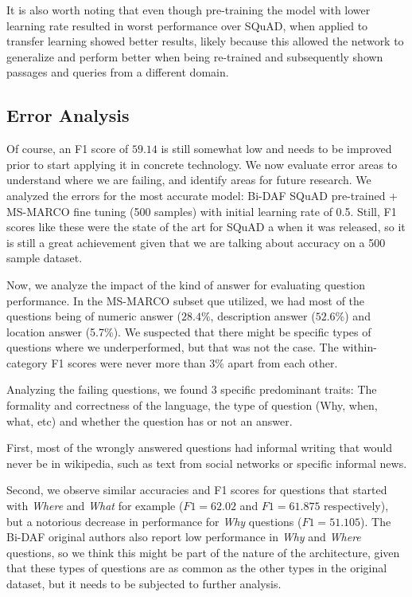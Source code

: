 \documentclass[11pt,a4paper]{article}
\begin{document}
It is also worth noting that even though pre-training the model with lower learning rate resulted in worst performance over SQuAD, when applied to transfer learning showed better results, likely because this allowed the network to generalize and perform better when being re-trained and subsequently shown passages and queries from a different domain.

\subsection {Error Analysis}

Of course, an F1 score of $59.14$ is still somewhat low and needs to be improved prior to start applying it in concrete technology. We now evaluate error areas to understand where we are failing, and identify areas for future research. We analyzed the errors for the most accurate model: Bi-DAF SQuAD pre-trained + MS-MARCO fine tuning (500 samples) with initial learning rate of 0.5. Still, F1 scores like these were the state of the art for SQuAD a when it was released, so it is still a great achievement given that we are talking about accuracy on a 500 sample dataset.

Now, we analyze the impact of the kind of answer for evaluating question performance. In the MS-MARCO subset que utilized, we had most of the questions being of numeric answer ($28.4\%$, description answer ($52.6\%$) and location answer (5.7\%). We suspected that there might be specific types of questions where we underperformed, but that was not the case. The within-category F1 scores were never more than 3\% apart from each other.

Analyzing the failing questions, we found 3 specific predominant traits: The formality and correctness of the language, the type of question (Why, when, what, etc) and whether the question has or not an answer.

First, most of the wrongly answered questions had informal writing that would never be in wikipedia, such as text from social networks or specific informal news. 

Second, we observe similar accuracies and F1 scores for questions that started with \textit{Where} and \textit{What} for example ($F1=62.02$ and $F1=61.875$ respectively), but a notorious decrease in performance for \textit{Why} questions ($F1 = 51.105$). The Bi-DAF original authors also report low performance in \textit{Why} and \textit{Where} questions, so we think this might be part of the nature of the architecture, given that these types of questions are as common as the other types in the original dataset, but it needs to be subjected to further analysis.
\end{document}
